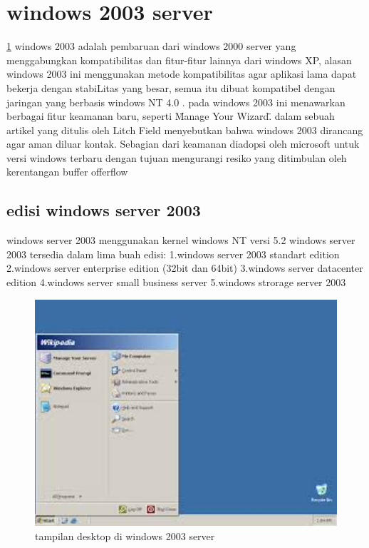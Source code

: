 \section{windows 2003 server}
\ref{windows2003server}
	windows 2003 adalah pembaruan dari windows 2000 server yang menggabungkan kompatibilitas dan fitur-fitur lainnya dari windows XP, alasan windows 2003 ini menggunakan metode kompatibilitas agar aplikasi lama dapat bekerja dengan stabiLitas yang besar, semua itu dibuat kompatibel dengan jaringan yang berbasis windows NT 4.0 . pada windows 2003 ini menawarkan berbagai fitur keamanan baru, seperti \"Manage Your Wizard\".
	dalam sebuah artikel yang ditulis oleh Litch Field menyebutkan bahwa windows 2003 dirancang agar aman diluar kontak. Sebagian dari keamanan diadopsi oleh microsoft untuk versi windows terbaru dengan tujuan mengurangi resiko yang ditimbulan oleh kerentangan buffer offerflow \cite{litchfield2003defeating}
	\subsection{edisi windows server 2003}
		windows server 2003 menggunakan kernel windows NT versi 5.2 
		windows server 2003 tersedia dalam lima buah edisi:
		1.windows server 2003 standart edition
 		2.windows server enterprise edition (32bit dan 64bit)
		3.windows server datacenter edition
		4.windows server small business server
		5.windows strorage server 2003


\begin{figure}[ht]
\centerline{\includegraphics[width=1\textwidth]{figures/windows2003server.JPG}}
\caption{tampilan desktop di windows 2003 server}
\label{windows2003server}
\end{figure}
